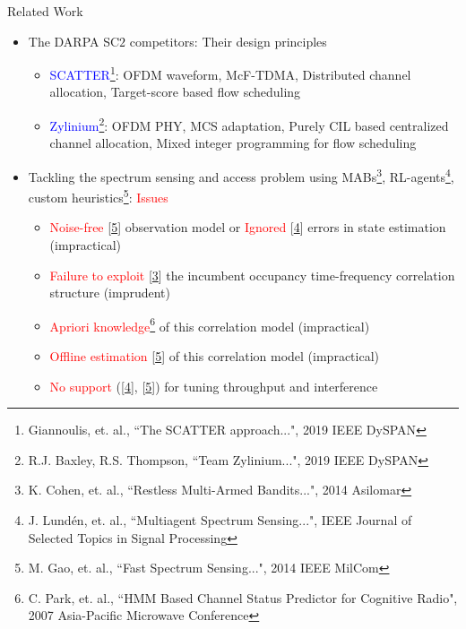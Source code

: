 \documentclass{beamer}
\begin{document}
\begin{frame}{Related Work}
\begin{itemize}
  \item \scriptsize{The DARPA SC$2$ competitors: Their design principles}
  \begin{itemize}
      \item \scriptsize{\textcolor{blue}{SCATTER}\footnote{\tiny{Giannoulis, et. al., ``The SCATTER approach...", 2019 IEEE DySPAN}}: OFDM waveform, McF-TDMA, Distributed channel allocation, Target-score based flow scheduling}
      \item \scriptsize{\textcolor{blue}{Zylinium}\footnote{\tiny{R.J. Baxley, R.S. Thompson, ``Team Zylinium...", 2019 IEEE DySPAN}}: OFDM PHY, MCS adaptation, Purely CIL based centralized channel allocation, Mixed integer programming for flow scheduling}
  \end{itemize}
  \item \scriptsize{Tackling the spectrum sensing and access problem using MABs\footnote{\label{F5}\tiny{K. Cohen, et. al., ``Restless Multi-Armed Bandits...", 2014 Asilomar}}, RL-agents\footnote{\label{F3}\tiny{J. Lund\'{e}n, et. al., ``Multiagent Spectrum Sensing...", IEEE Journal of Selected Topics in Signal Processing}}, custom heuristics\footnote{\label{F4}\tiny{M. Gao, et. al., ``Fast Spectrum Sensing...", 2014 IEEE MilCom}}: \textcolor{red}{Issues}}
  \begin{itemize}
      \item \scriptsize{\textcolor{red}{Noise-free} [\ref{F4}] observation model or \textcolor{red}{Ignored} [\ref{F3}] errors in state estimation (impractical)}
      \item \scriptsize{\textcolor{red}{Failure to exploit} [\ref{F5}] the incumbent occupancy time-frequency correlation structure (imprudent)}
      \item \scriptsize{\textcolor{red}{Apriori knowledge}\footnote{\label{F6}\tiny{C. Park, et. al., ``HMM Based Channel Status Predictor for Cognitive Radio", 2007 Asia-Pacific Microwave Conference}} of this correlation model (impractical)}
      \item \scriptsize{\textcolor{red}{Offline estimation} [\ref{F4}] of this correlation model (impractical)}
      \item \scriptsize{\textcolor{red}{No support} ([\ref{F3}], [\ref{F4}]) for tuning throughput and interference}
  \end{itemize}
\end{itemize}
\end{frame}
\end{document}
